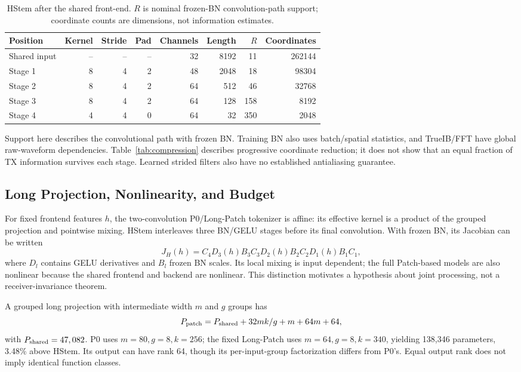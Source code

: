 \documentclass[journal]{IEEEtran}
\begin{document}
\begin{table}[t]\centering
\caption{HStem after the shared front-end. $R$ is nominal frozen-BN convolution-path support; coordinate counts are dimensions, not information estimates.}
\label{tab:compression}\label{tab:arch}
\begin{tabular}{lrrrrrrr}\toprule
Position & Kernel & Stride & Pad & Channels & Length & $R$ & Coordinates\\\midrule
Shared input &--&--&--&32&8192&11&262144\\
Stage 1&8&4&2&48&2048&18&98304\\
Stage 2&8&4&2&64&512&46&32768\\
Stage 3&8&4&2&64&128&158&8192\\
Stage 4&4&4&0&64&32&350&2048\\\bottomrule
\end{tabular}\end{table}

Support here describes the convolutional path with frozen BN. Training BN also uses batch/spatial statistics, and TrueIB/FFT have global raw-waveform dependencies. Table~\ref{tab:compression} describes progressive coordinate reduction; it does not show that an equal fraction of TX information survives each stage. Learned strided filters also have no established antialiasing guarantee.

\subsection{Long Projection, Nonlinearity, and Budget}
For fixed frontend features $h$, the two-convolution P0/Long-Patch tokenizer is affine: its effective kernel is a product of the grouped projection and pointwise mixing. HStem interleaves three BN/GELU stages before its final convolution. With frozen BN, its Jacobian can be written
\begin{equation}
 J_H(h)=C_4D_3(h)B_3C_3D_2(h)B_2C_2D_1(h)B_1C_1,
\end{equation}
where $D_l$ contains GELU derivatives and $B_l$ frozen BN scales. Its local mixing is input dependent; the full Patch-based models are also nonlinear because the shared frontend and backend are nonlinear. This distinction motivates a hypothesis about joint processing, not a receiver-invariance theorem.

A grouped long projection with intermediate width $m$ and $g$ groups has
\begin{equation}
 P_{\rm patch}=P_{\rm shared}+32mk/g+m+64m+64,
\end{equation}
with $P_{\rm shared}=47,082$. P0 uses $m=80,g=8,k=256$; the fixed Long-Patch uses $m=64,g=8,k=340$, yielding 138,346 parameters, 3.48\% above HStem. Its output can have rank 64, though its per-input-group factorization differs from P0's. Equal output rank does not imply identical function classes.
\end{document}
